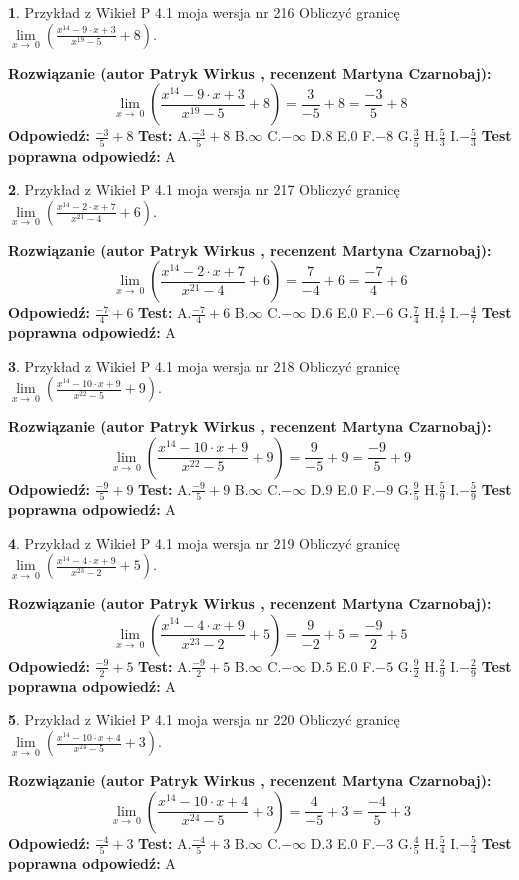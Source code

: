 \documentclass[12pt, a4paper]{article}
\theoremstyle{definition} %
\newtheorem{zad}{}
\newcommand{\zadStart}[1]{\begin{zad}#1\newline}
\newcommand{\zadStop}{\end{zad}}
\newcommand{\rozwStart}[2]{\noindent \textbf{Rozwiązanie (autor #1 , recenzent #2): }\newline}
\newcommand{\rozwStop}{\newline}
\newcommand{\odpStart}{\noindent \textbf{Odpowiedź:}\newline}
\newcommand{\odpStop}{\newline}
\newcommand{\testStart}{\noindent \textbf{Test:}\newline}
\newcommand{\testStop}{\newline}
\newcommand{\kluczStart}{\noindent \textbf{Test poprawna odpowiedź:}\newline}
\newcommand{\kluczStop}{\newline}
\begin{document}
\zadStart{Przykład z Wikieł P 4.1 moja wersja nr 216}
Obliczyć granicę $\lim\limits_{x\to\ 0}(\frac{x^{14}-9 \cdot x +3}{x^{19}-5}+8)$.
\zadStop
\rozwStart{Patryk Wirkus}{Martyna Czarnobaj}
$$\lim\limits_{x\to\ 0}(\frac{x^{14}-9 \cdot x +3}{x^{19}-5}+8)=\frac{3}{-5}+8=\frac{-3}{5}+8$$
\rozwStop
\odpStart
$\frac{-3}{5}+8$
\odpStop
\testStart
A.$\frac{-3}{5}+8$
B.$\infty$
C.$-\infty$
D.$8$
E.$0$
F.$-8$
G.$\frac{3}{5}$
H.$\frac{5}{3}$
I.$-\frac{5}{3}$
\testStop
\kluczStart
A
\kluczStop



\zadStart{Przykład z Wikieł P 4.1 moja wersja nr 217}
Obliczyć granicę $\lim\limits_{x\to\ 0}(\frac{x^{14}-2 \cdot x +7}{x^{21}-4}+6)$.
\zadStop
\rozwStart{Patryk Wirkus}{Martyna Czarnobaj}
$$\lim\limits_{x\to\ 0}(\frac{x^{14}-2 \cdot x +7}{x^{21}-4}+6)=\frac{7}{-4}+6=\frac{-7}{4}+6$$
\rozwStop
\odpStart
$\frac{-7}{4}+6$
\odpStop
\testStart
A.$\frac{-7}{4}+6$
B.$\infty$
C.$-\infty$
D.$6$
E.$0$
F.$-6$
G.$\frac{7}{4}$
H.$\frac{4}{7}$
I.$-\frac{4}{7}$
\testStop
\kluczStart
A
\kluczStop



\zadStart{Przykład z Wikieł P 4.1 moja wersja nr 218}
Obliczyć granicę $\lim\limits_{x\to\ 0}(\frac{x^{14}-10 \cdot x +9}{x^{22}-5}+9)$.
\zadStop
\rozwStart{Patryk Wirkus}{Martyna Czarnobaj}
$$\lim\limits_{x\to\ 0}(\frac{x^{14}-10 \cdot x +9}{x^{22}-5}+9)=\frac{9}{-5}+9=\frac{-9}{5}+9$$
\rozwStop
\odpStart
$\frac{-9}{5}+9$
\odpStop
\testStart
A.$\frac{-9}{5}+9$
B.$\infty$
C.$-\infty$
D.$9$
E.$0$
F.$-9$
G.$\frac{9}{5}$
H.$\frac{5}{9}$
I.$-\frac{5}{9}$
\testStop
\kluczStart
A
\kluczStop



\zadStart{Przykład z Wikieł P 4.1 moja wersja nr 219}
Obliczyć granicę $\lim\limits_{x\to\ 0}(\frac{x^{14}-4 \cdot x +9}{x^{23}-2}+5)$.
\zadStop
\rozwStart{Patryk Wirkus}{Martyna Czarnobaj}
$$\lim\limits_{x\to\ 0}(\frac{x^{14}-4 \cdot x +9}{x^{23}-2}+5)=\frac{9}{-2}+5=\frac{-9}{2}+5$$
\rozwStop
\odpStart
$\frac{-9}{2}+5$
\odpStop
\testStart
A.$\frac{-9}{2}+5$
B.$\infty$
C.$-\infty$
D.$5$
E.$0$
F.$-5$
G.$\frac{9}{2}$
H.$\frac{2}{9}$
I.$-\frac{2}{9}$
\testStop
\kluczStart
A
\kluczStop



\zadStart{Przykład z Wikieł P 4.1 moja wersja nr 220}
Obliczyć granicę $\lim\limits_{x\to\ 0}(\frac{x^{14}-10 \cdot x +4}{x^{24}-5}+3)$.
\zadStop
\rozwStart{Patryk Wirkus}{Martyna Czarnobaj}
$$\lim\limits_{x\to\ 0}(\frac{x^{14}-10 \cdot x +4}{x^{24}-5}+3)=\frac{4}{-5}+3=\frac{-4}{5}+3$$
\rozwStop
\odpStart
$\frac{-4}{5}+3$
\odpStop
\testStart
A.$\frac{-4}{5}+3$
B.$\infty$
C.$-\infty$
D.$3$
E.$0$
F.$-3$
G.$\frac{4}{5}$
H.$\frac{5}{4}$
I.$-\frac{5}{4}$
\testStop
\kluczStart
A
\kluczStop
\end{document}
